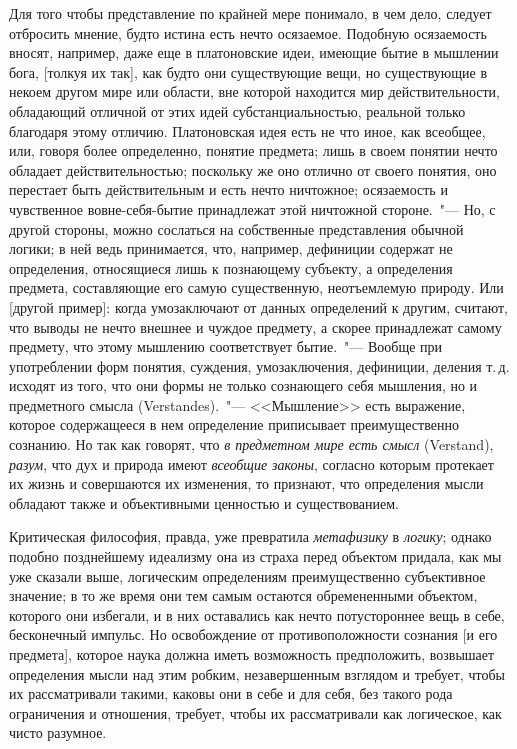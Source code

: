 Для того чтобы представление по крайней мере понимало,
в чем дело, следует отбросить мнение, будто истина
есть нечто осязаемое. Подобную осязаемость вносят, например,
даже еще в платоновские идеи, имеющие бытие
в мышлении бога, [толкуя их так], как будто они существующие
вещи, но существующие в некоем другом мире
или области, вне которой находится мир действительности,
обладающий отличной от этих идей субстанциальностью,
реальной только благодаря этому отличию.
Платоновская идея есть не что иное, как всеобщее, или,
говоря более определенно, понятие предмета; лишь
в своем понятии нечто обладает действительностью; поскольку
же оно отлично от своего понятия, оно перестает
быть действительным и есть нечто ничтожное; осязаемость
и чувственное вовне-себя-бытие принадлежат этой
ничтожной стороне.~"--- Но, с другой стороны, можно сослаться
на собственные представления обычной логики;
в ней ведь принимается, что, например, дефиниции содержат
не определения, относящиеся лишь к познающему
субъекту, а определения предмета, составляющие его
самую существенную, неотъемлемую природу. Или [другой
пример]: когда умозаключают от данных определений
к другим, считают, что выводы не нечто внешнее и чуждое
предмету, а скорее принадлежат самому предмету,
что этому мышлению соответствует бытие.~"--- Вообще при
употреблении форм понятия, суждения, умозаключения,
дефиниции, деления т.\,д. исходят из того, что они формы
не только сознающего себя мышления, но и предметного
смысла (Verstandes).~"--- <<Мышление>> есть выражение, которое
содержащееся в нем определение приписывает
преимущественно сознанию. Но так как говорят, что
\emph{в предметном мире есть смысл} (Verstand), \emph{разум}, что
дух и природа имеют \emph{всеобщие законы}, согласно которым
протекает их жизнь и совершаются их изменения, то
признают, что определения мысли обладают также
и объективными ценностью и существованием.

Критическая философия, правда, уже превратила
\emph{метафизику} в \emph{логику}; однако подобно позднейшему
идеализму
она из страха перед объектом придала, как мы
уже сказали выше, логическим определениям преимущественно
субъективное значение; в то же время они
тем самым остаются обремененными объектом, которого
они избегали, и в них оставались как нечто потустороннее
вещь в себе,
бесконечный импульс. Но освобождение
от противоположности сознания [и его предмета],
которое наука должна иметь возможность предположить,
возвышает определения мысли над этим робким, незавершенным
взглядом и требует, чтобы их рассматривали
такими, каковы они в себе и для себя, без такого рода
ограничения и отношения, требует, чтобы их рассматривали
как логическое, как чисто разумное.

